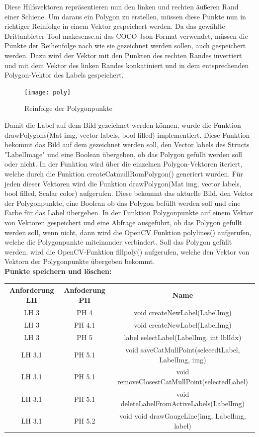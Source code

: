 \documentclass[11pt]{scrartcl}
\begin{document}
\noindent
Diese Hilfsvektoren repräsentieren nun den linken und rechten äußeren Rand einer Schiene. Um daraus ein Polygon zu erstellen, müssen diese Punkte nun in richtiger Reinfolge in einem Vektor gespeichert werden. Da das gewählte Drittanbieter-Tool makesense.ai das COCO Json-Format verwendet, müssen die Punkte der Reihenfolge nach wie sie gezeichnet werden sollen, auch gespeichert werden. Dazu wird der Vektor mit den Punkten des rechten Randes invertiert und mit dem Vektor des linken Randes konkatiniert und in dem entsprechenden Polygon-Vektor des Labels gespeichert.
\begin{figure}[H]
  \texttt{[image: poly]}
  \caption{Reinfolge der Polygonpunkte}
\end{figure}
\noindent
Damit die Label auf dem Bild gezeichnet werden können, wurde die Funktion drawPolygons(Mat img, vector labels, bool filled) implementiert. Diese Funktion bekommt das Bild  auf dem gezeichnet werden soll, den Vector labels des Structs "LabelImage" und eine Boolean übergeben, ob das Polygon gefüllt werden soll oder nicht. In der Funktion wird über die einzelnen Polygon-Vektoren iteriert, welche durch die Funktion createCatmullRomPolygon() generiert wurden. Für jeden dieser Vektoren wird die Funktion drawPolygon(Mat img, vector labels, bool filled, Scalar color) aufgerufen. Diese bekommt das aktuelle Bild, den Vektor der Polygonpunkte, eine Boolean ob das Polygon befüllt werden soll und eine Farbe für das Label übergeben. In der Funktion Polygonpunkte auf einem Vektor von Vektoren gespeichert und eine Abfrage ausgeführt, ob das Polygon gefüllt werden soll, wenn nicht, dann wird die OpenCV Funktion polylines() aufgerufen, welche die Polygonpunkte miteinander verbindert. Soll das Polygon gefüllt werden, wird die OpenCV-Funktion fillpoly() aufgerufen, welche den Vektor von Vektorn der Polygonpunkte übergeben bekommt. 
\\

\noindent
\textbf{Punkte speichern und löschen:}
\\

\noindent
\begin{tabular}[h]{c|c|c}
Anforderung LH & Anfoderung PH & Name \\
\hline
 LH 3& PH 4 & void createNewLabel(LabelImg)\\
LH 3 & PH 4.1 & void createNewLabel(LabelImg)\\
LH 3 & PH 5 &label selectLabel(LabelImg, int lblIdx)\\
LH 3.1 & PH 5.1 & void saveCatMullPoint(selecedtLabel, LabelImg, img)\\
LH 3.1 & PH 5.1 & void removeClosestCatMullPoint(selectedLabel)\\
LH 3.1 & PH 5.1 & void deleteLabelFromActiveLabels(LabelImg)\\
LH 3.1 & PH 5.2 & void void drawGaugeLine(img, LabelImg, label)\\
\end{tabular}
\\
\end{document}
